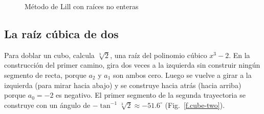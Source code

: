 \begin{figure}[t]
\begin{center}
\end{center}
\caption{Método de Lill con raíces no enteras}\label{f.noninteger}
\end{figure}

\subsection{La raíz cúbica de dos}\label{s.cube}
Para doblar un cubo, calcula $\sqrt[3]{2}$, una raíz del polinomio cúbico $x^3-2$. En la construcción del primer camino, gira dos veces a la izquierda sin construir ningún segmento de recta, porque $a_2$ y $a_1$ son ambos cero. Luego se vuelve a girar a la izquierda (para mirar hacia abajo) y se construye hacia atrás (hacia arriba) porque $a_0=-2$ es negativo. El primer segmento de la segunda trayectoria se construye con un ángulo de $-\tan^{-1} \sqrt[3]{2}\approx -51.6^\circ$ (Fig.~\ref{f.cube-two}).

